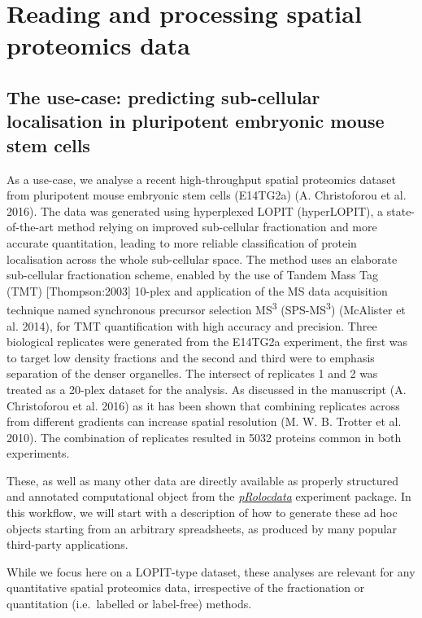 \section{Reading and processing spatial proteomics
data}\label{reading-and-processing-spatial-proteomics-data}

\subsection{The use-case: predicting sub-cellular localisation in
pluripotent embryonic mouse stem
cells}\label{the-use-case-predicting-sub-cellular-localisation-in-pluripotent-embryonic-mouse-stem-cells}

As a use-case, we analyse a recent high-throughput spatial proteomics
dataset from pluripotent mouse embryonic stem cells (E14TG2a) (A.
Christoforou et al. 2016). The data was generated using hyperplexed
LOPIT (hyperLOPIT), a state-of-the-art method relying on improved
sub-cellular fractionation and more accurate quantitation, leading to
more reliable classification of protein localisation across the whole
sub-cellular space. The method uses an elaborate sub-cellular
fractionation scheme, enabled by the use of Tandem Mass Tag (TMT)
{[}Thompson:2003{]} 10-plex and application of the MS data acquisition
technique named synchronous precursor selection MS\textsuperscript{3}
(SPS-MS\textsuperscript{3}) (McAlister et al. 2014), for TMT
quantification with high accuracy and precision. Three biological
replicates were generated from the E14TG2a experiment, the first was to
target low density fractions and the second and third were to emphasis
separation of the denser organelles. The intersect of replicates 1 and 2
was treated as a 20-plex dataset for the analysis. As discussed in the
manuscript (A. Christoforou et al. 2016) as it has been shown that
combining replicates across from different gradients can increase
spatial resolution (M. W. B. Trotter et al. 2010). The combination of
replicates resulted in 5032 proteins common in both experiments.

These, as well as many other data are directly available as properly
structured and annotated computational object from the
\emph{\href{http://bioconductor.org/packages/pRolocdata}{pRolocdata}}
experiment package. In this workflow, we will start with a description
of how to generate these ad hoc objects starting from an arbitrary
spreadsheets, as produced by many popular third-party applications.

While we focus here on a LOPIT-type dataset, these analyses are relevant
for any quantitative spatial proteomics data, irrespective of the
fractionation or quantitation (i.e.~labelled or label-free) methods.

